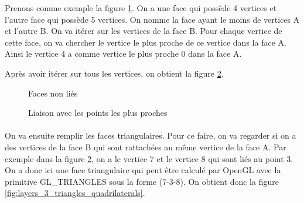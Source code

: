 \documentclass[article, backcover, french, nodocumentinfo]{upmethodology-document}
\begin{document}
		Prenons comme exemple la figure \ref{fig:layers_1_empty}. On a une face qui possède 4 vertices et l'autre face qui possède 5 vertices. On nomme la face ayant le moins de vertices A et l'autre B. On va itérer sur les vertices de la face B. Pour chaque vertice de cette face, on va chercher le vertice le plus proche de ce vertice dans la face A. Ainsi le vertice 4 a comme vertice le plus proche 0 dans la face A.
		
		Après avoir itérer sur tous les vertices, on obtient la figure \ref{fig:layers_2_nearest_lines}.
		
		\par\noindent\begin{minipage}[t]{\textwidth}
			\centering
			\begin{minipage}[t]{0.49\textwidth}
				\begin{figure}[H]
					\centering%
					\caption{Faces non liés}%
					\label{fig:layers_1_empty}%
				\end{figure}
			\end{minipage}
			\begin{minipage}[t]{0.49\textwidth}
				\begin{figure}[H]
					\centering%
					\caption{Liaison avec les points les plus proches}%
					\label{fig:layers_2_nearest_lines}%
				\end{figure}
			\end{minipage}
		\end{minipage}
		\paragraph{} On va ensuite remplir les faces triangulaires. Pour ce faire, on va regarder si on a des vertices de la face B qui sont rattachées au même vertice de la face A. Par exemple dans la figure \ref{fig:layers_2_nearest_lines}, on a le vertice 7 et le vertice 8 qui sont liés au point 3. On a donc ici une face triangulaire qui peut être calculé par OpenGL avec la primitive GL\_TRIANGLES sous la forme (7-3-8). On obtient donc la figure \ref{fig:layers_3_triangles_quadrilaterals}.
		
\end{document}
